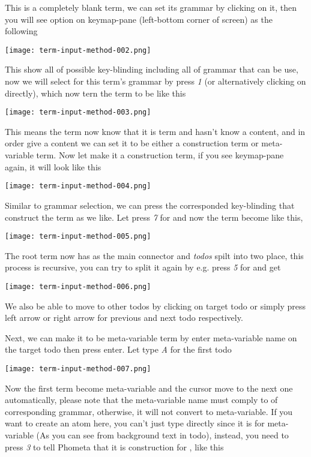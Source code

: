 \documentclass[master.tex]{subfiles}
\begin{document}
This is a completely blank term, we can set its grammar by clicking on it, then
you will see option on keymap-pane (left-bottom corner of screen) as the following

\centerline{\texttt{[image: term-input-method-002.png]}}

This show all of possible key-blinding including all of grammar that can be use,
now we will select  for this term's grammar by press \emph{1}
(or alternatively clicking on  directly), which now tern the
term to be like this

\centerline{\texttt{[image: term-input-method-003.png]}}

This means the term now know that it is  term and hasn't know a
content, and in order give a content we can set it to be either a construction
term or meta-variable term. Now let make it a construction term, if you see
keymap-pane again, it will look like this

\centerline{\texttt{[image: term-input-method-004.png]}}

Similar to grammar selection, we can press the corresponded key-blinding that
construct the term as we like. Let press \emph{7} for  and now the term become like this,

\centerline{\texttt{[image: term-input-method-005.png]}}

The root term now has \pifmt{$\rightarrow$} as the main connector and
\emph{todos} spilt into two place, this process is recursive, you can try to
split it again by e.g. press \emph{5} for  and get

\centerline{\texttt{[image: term-input-method-006.png]}}

We also be able to move to other todos by clicking on target todo or simply
press left arrow or right arrow for previous and next todo respectively.

Next, we can make it to be meta-variable term by enter meta-variable name on the
target todo then press enter. Let type \emph{A} for the first todo

\centerline{\texttt{[image: term-input-method-007.png]}}

Now the first term become meta-variable and the cursor move to the next one
automatically, please note that the meta-variable name must comply to \kVarRegex
of corresponding grammar, otherwise, it will not convert to meta-variable. If
you want to create an atom here, you can't just type directly since it is for
 meta-variable (As you can see from background text in todo),
instead, you need to press \emph{3} to tell Phometa that it is construction for
, like this
\end{document}

